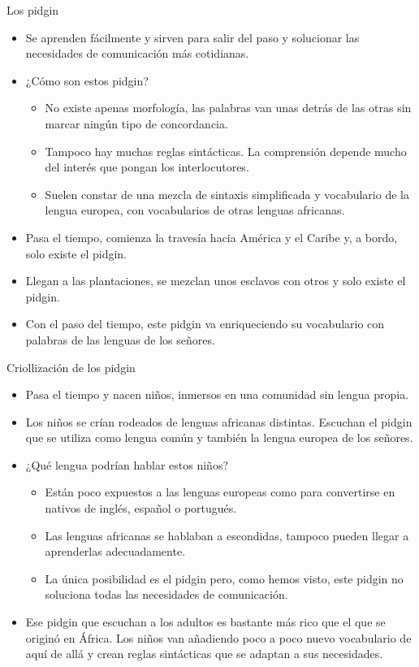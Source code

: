 \documentclass[handout]{beamer}
\begin{document}
\begin{frame}{Los pidgin}
\begin{itemize}
	\item Se aprenden fácilmente y sirven para salir del paso y solucionar las necesidades de comunicación más cotidianas.
	\item ¿Cómo son estos pidgin? 
	\begin{itemize}
		\item No existe apenas morfología, las palabras van unas detrás de las otras sin marcar ningún tipo de concordancia.
		\item Tampoco hay muchas reglas sintácticas. La comprensión depende mucho del interés que pongan los interlocutores.
		\item Suelen constar de una mezcla de sintaxis simplificada y vocabulario de la lengua europea, con vocabularios de otras lenguas africanas.
	\end{itemize}
	\item Pasa el tiempo, comienza la travesía hacia América y el Caribe y, a bordo, solo existe el pidgin.
	\item Llegan a las plantaciones, se mezclan unos esclavos con otros y solo existe el pidgin.
	\item Con el paso del tiempo, este pidgin va enriqueciendo su vocabulario con palabras de las lenguas de los señores.
\end{itemize}

\end{frame}

\begin{frame}{Criollización de los pidgin}

\begin{itemize}
	\item Pasa el tiempo y nacen niños, inmersos en una comunidad sin lengua propia.
	\item Los niños se crían rodeados de lenguas africanas distintas. Escuchan el pidgin que se utiliza como lengua común y también la lengua europea de los señores.
	\item ¿Qué lengua podrían hablar estos niños?
	\begin{itemize}
		\item Están poco expuestos a las lenguas europeas como para convertirse en nativos de inglés, español o portugués.
		\item Las lenguas africanas se hablaban a escondidas, tampoco pueden llegar a aprenderlas adecuadamente.
		\item La única posibilidad es el pidgin pero, como hemos visto, este pidgin no soluciona todas las necesidades de comunicación.
	\end{itemize}
	\item Ese pidgin que escuchan a los adultos es bastante más rico que el que se originó en África. Los niños van añadiendo poco a poco nuevo vocabulario de aquí de allá y crean reglas sintácticas que se adaptan a sus necesidades.  
\end{itemize}
\end{frame}
\end{document}
